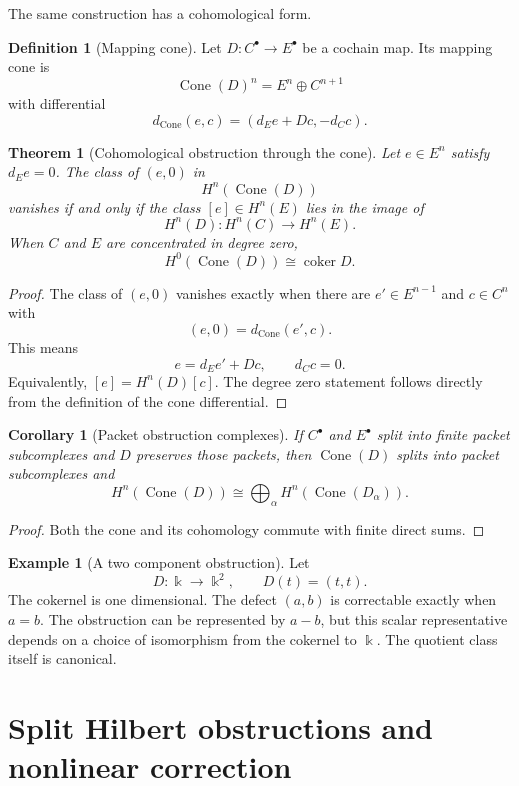 \documentclass[11pt,a4paper]{article}
\newtheorem{theorem}{Theorem}[section]
\theoremstyle{plain}
\newtheorem{corollary}[corollary]{Corollary}
\theoremstyle{definition}
\newtheorem{definition}[definition]{Definition}
\newtheorem{example}[example]{Example}
\theoremstyle{remark}
\newcommand{\bbk}{\Bbbk}
\newcommand{\coker}{\operatorname{coker}}
\newcommand{\Cone}{\operatorname{Cone}}
\begin{document}
The same construction has a cohomological form.

\begin{definition}[Mapping cone]\label{def:mapping_cone}
Let $D:C^\bullet\to E^\bullet$ be a cochain map.  Its mapping cone is
\[
\Cone(D)^n=E^n\oplus C^{n+1}
\]
with differential
\[
d_{\Cone}(e,c)=(d_Ee+Dc,-d_Cc).
\]
\end{definition}

\begin{theorem}[Cohomological obstruction through the cone]\label{thm:cone_obstruction}
Let $e\in E^n$ satisfy $d_Ee=0$.  The class of $(e,0)$ in
\[
H^n(\Cone(D))
\]
vanishes if and only if the class $[e]\in H^n(E)$ lies in the image of
\[
H^n(D):H^n(C)\longrightarrow H^n(E).
\]
When $C$ and $E$ are concentrated in degree zero,
\[
H^0(\Cone(D))\cong\coker D.
\]
\end{theorem}

\begin{proof}
The class of $(e,0)$ vanishes exactly when there are $e'\in E^{n-1}$ and $c\in C^n$ with
\[
(e,0)=d_{\Cone}(e',c).
\]
This means
\[
e=d_Ee'+Dc,
\qquad
d_Cc=0.
\]
Equivalently, $[e]=H^n(D)[c]$.  The degree zero statement follows directly from the definition of the cone differential.
\end{proof}

\begin{corollary}[Packet obstruction complexes]\label{cor:packet_obstruction_complexes}
If $C^\bullet$ and $E^\bullet$ split into finite packet subcomplexes and $D$ preserves those packets, then $\Cone(D)$ splits into packet subcomplexes and
\[
H^n(\Cone(D))
\cong
\bigoplus_\alpha H^n(\Cone(D_\alpha)).
\]
\end{corollary}

\begin{proof}
Both the cone and its cohomology commute with finite direct sums.
\end{proof}

\begin{example}[A two component obstruction]\label{ex:two_component_obstruction}
Let
\[
D:\bbk\longrightarrow\bbk^2,
\qquad
D(t)=(t,t).
\]
The cokernel is one dimensional.  The defect $(a,b)$ is correctable exactly when $a=b$.  The obstruction can be represented by $a-b$, but this scalar representative depends on a choice of isomorphism from the cokernel to $\bbk$.  The quotient class itself is canonical.
\end{example}

\section{Split Hilbert obstructions and nonlinear correction}\label{sec:split_obstruction}
\end{document}
